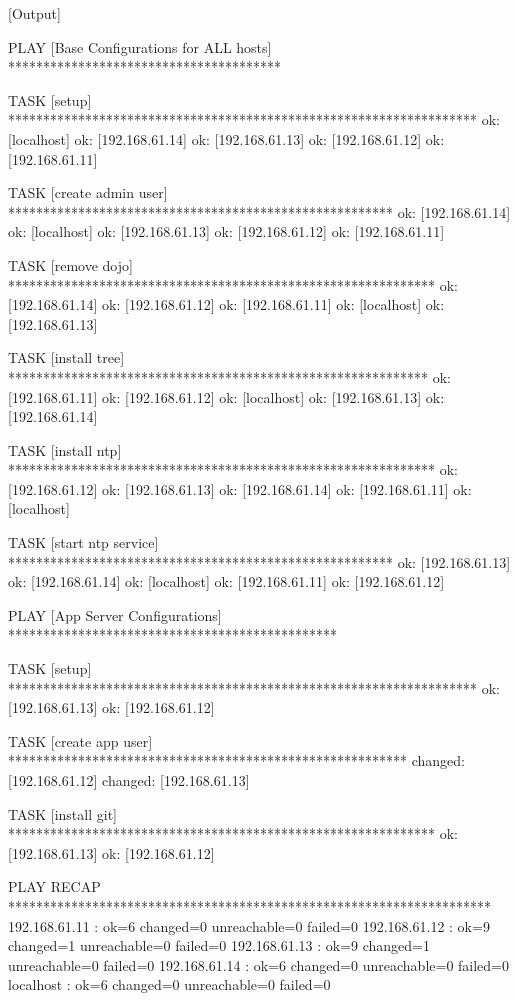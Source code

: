 [Output]\newline
\begin{code}
PLAY [Base Configurations for ALL hosts] ***************************************

TASK [setup] *******************************************************************
ok: [localhost]
ok: [192.168.61.14]
ok: [192.168.61.13]
ok: [192.168.61.12]
ok: [192.168.61.11]

TASK [create admin user] *******************************************************
ok: [192.168.61.14]
ok: [localhost]
ok: [192.168.61.13]
ok: [192.168.61.12]
ok: [192.168.61.11]

TASK [remove dojo] *************************************************************
ok: [192.168.61.14]
ok: [192.168.61.12]
ok: [192.168.61.11]
ok: [localhost]
ok: [192.168.61.13]

TASK [install tree] ************************************************************
ok: [192.168.61.11]
ok: [192.168.61.12]
ok: [localhost]
ok: [192.168.61.13]
ok: [192.168.61.14]

TASK [install ntp] *************************************************************
ok: [192.168.61.12]
ok: [192.168.61.13]
ok: [192.168.61.14]
ok: [192.168.61.11]
ok: [localhost]

TASK [start ntp service] *******************************************************
ok: [192.168.61.13]
ok: [192.168.61.14]
ok: [localhost]
ok: [192.168.61.11]
ok: [192.168.61.12]

PLAY [App Server Configurations] ***********************************************

TASK [setup] *******************************************************************
ok: [192.168.61.13]
ok: [192.168.61.12]

TASK [create app user] *********************************************************
changed: [192.168.61.12]
changed: [192.168.61.13]

TASK [install git] *************************************************************
ok: [192.168.61.13]
ok: [192.168.61.12]

PLAY RECAP *********************************************************************
192.168.61.11              : ok=6    changed=0    unreachable=0    failed=0
192.168.61.12              : ok=9    changed=1    unreachable=0    failed=0
192.168.61.13              : ok=9    changed=1    unreachable=0    failed=0
192.168.61.14              : ok=6    changed=0    unreachable=0    failed=0
localhost                  : ok=6    changed=0    unreachable=0    failed=0
\end{code}

